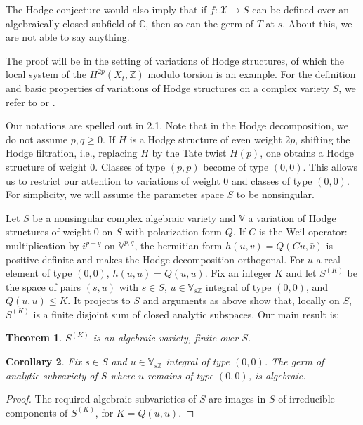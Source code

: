 \documentclass[11pt,a4paper]{article}
\theoremstyle{plain}
\newtheorem{theorem}{Theorem}[section]
\newtheorem{corollary}[theorem]{Corollary}
\theoremstyle{definition}
\begin{document}
The Hodge conjecture would also imply that if $f:\mathcal{X}\to S$ can be defined over an algebraically closed subfield of $\mathbb{C}$, then so can the germ of $T$ at $s$. About this, we are not able to say anything.

The proof will be in the setting of variations of Hodge structures, of which the local system of the $H^{2p}(X_t,\mathbb{Z})$ modulo torsion is an example. For the definition and basic properties of variations of Hodge structures on a complex variety $S$, we refer to \cite{griffiths} or \cite{schmid}.

Our notations are spelled out in 2.1. Note that in the Hodge decomposition, we do not assume $p,q\geq 0$. If $H$ is a Hodge structure of even weight $2p$, shifting the Hodge filtration, i.e., replacing $H$ by the Tate twist $H(p)$, one obtains a Hodge structure of weight $0$. Classes of type $(p,p)$ become of type $(0,0)$. This allows us to restrict our attention to variations of weight $0$ and classes of type $(0,0)$. For simplicity, we will assume the parameter space $S$ to be nonsingular.

Let $S$ be a nonsingular complex algebraic variety and $\mathbb{V}$ a variation of Hodge structures of weight $0$ on $S$ with polarization form $Q$. If $C$ is the Weil operator: multiplication by $i^{p-q}$ on $\mathbb{V}^{p,q}$, the hermitian form $h(u,v)=Q(Cu,\bar{v})$ is positive definite and makes the Hodge decomposition orthogonal. For $u$ a real element of type $(0,0)$, $h(u,u)=Q(u,u)$. Fix an integer $K$ and let $S^{(K)}$ be the space of pairs $(s,u)$ with $s\in S$, $u\in \mathbb{V}_{s\mathbb{Z}}$ integral of type $(0,0)$, and $Q(u,u)\leq K$. It projects to $S$ and arguments as above show that, locally on $S$, $S^{(K)}$ is a finite disjoint sum of closed analytic subspaces. Our main result is:

\begin{theorem}\label{thm:main}
$S^{(K)}$ is an algebraic variety, finite over $S$.
\end{theorem}

\begin{corollary}\label{cor:germ}
Fix $s\in S$ and $u\in \mathbb{V}_{s\mathbb{Z}}$ integral of type $(0,0)$. The germ of analytic subvariety of $S$ where $u$ remains of type $(0,0)$, is algebraic.
\end{corollary}

\begin{proof}
The required algebraic subvarieties of $S$ are images in $S$ of irreducible components of $S^{(K)}$, for $K=Q(u,u)$.
\end{proof}
\end{document}
